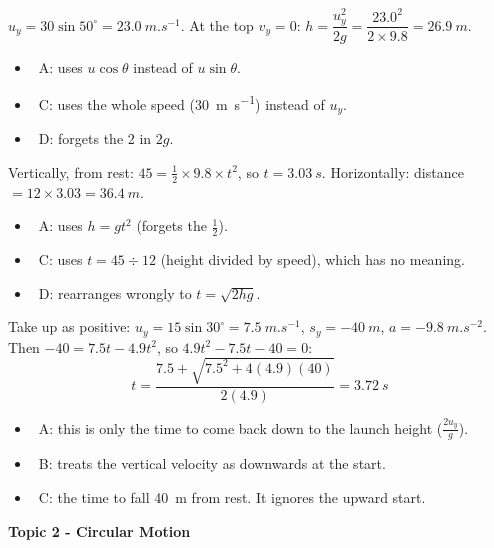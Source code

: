 \documentclass[12pt]{article}
\newcommand\anstopic[1]{\par\Needspace{8\baselineskip}\vspace{4mm}%
  \begin{center}{\headfont\bfseries\fontsize{14}{18}\selectfont #1\par}\end{center}\vspace{2pt}}
\begin{document}
\begin{practiceanswers}
\begin{practiceans}
  $u_y = 30\sin 50^\circ = \qty{23.0}{m.s^{-1}}$. At the top $v_y = 0$:
  $h = \dfrac{u_y^2}{2g} = \dfrac{23.0^2}{2 \times 9.8} = \qty{26.9}{m}$.
  \begin{itemize}
    \item \xmark\ A: uses $u\cos\theta$ instead of $u\sin\theta$.
    \item \xmark\ C: uses the whole speed (\qty{30}{m.s^{-1}}) instead of $u_y$.
    \item \xmark\ D: forgets the 2 in $2g$.
  \end{itemize}
\end{practiceans}

\begin{practiceans}
  Vertically, from rest: $45 = \frac{1}{2} \times 9.8 \times t^2$, so $t = \qty{3.03}{s}$.
  Horizontally: distance $= 12 \times 3.03 = \qty{36.4}{m}$.
  \begin{itemize}
    \item \xmark\ A: uses $h = gt^2$ (forgets the $\frac{1}{2}$).
    \item \xmark\ C: uses $t = 45 \div 12$ (height divided by speed), which has no meaning.
    \item \xmark\ D: rearranges wrongly to $t = \sqrt{2hg}$.
  \end{itemize}
\end{practiceans}

\begin{practiceans}
  Take up as positive: $u_y = 15\sin 30^\circ = \qty{7.5}{m.s^{-1}}$, $s_y = \qty{-40}{m}$,
  $a = \qty{-9.8}{m.s^{-2}}$. Then $-40 = 7.5t - 4.9t^2$, so $4.9t^2 - 7.5t - 40 = 0$:
  \[ t = \frac{7.5 + \sqrt{7.5^2 + 4(4.9)(40)}}{2(4.9)} = \qty{3.72}{s} \]
  \begin{itemize}
    \item \xmark\ A: this is only the time to come back down to the launch height ($\frac{2u_y}{g}$).
    \item \xmark\ B: treats the vertical velocity as downwards at the start.
    \item \xmark\ C: the time to fall \qty{40}{m} from rest. It ignores the upward start.
  \end{itemize}
\end{practiceans}

\anstopic{Topic 2 - Circular Motion}


\end{practiceanswers}
\end{document}
